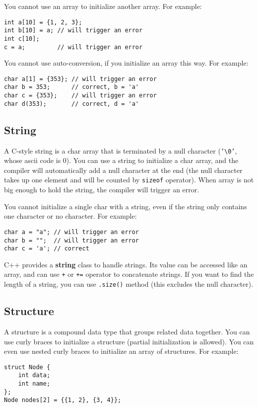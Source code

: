 \documentclass[a4paper,12pt]{article}
\begin{document}
You cannot use an array to initialize another array.
For example:
\begin{verbatim}
int a[10] = {1, 2, 3};
int b[10] = a; // will trigger an error
int c[10];
c = a;         // will trigger an error
\end{verbatim}

You cannot use auto-conversion, if you initialize an array this way.
For example:
\begin{verbatim}
char a[1] = {353}; // will trigger an error
char b = 353;      // correct, b = 'a'
char c = {353};    // will trigger an error
char d(353);       // correct, d = 'a'
\end{verbatim}

\subsection{String}

A C-style string is a char array that is terminated by a null character (\texttt{'\textbackslash 0'}, whose ascii code is 0).
You can use a string to initialize a char array, and the compiler will automatically add a null character at the end (the null character takes up one element and will be counted by \texttt{sizeof} operator).
When array is not big enough to hold the string, the compiler will trigger an error.

You cannot initialize a single char with a string, even if the string only contains one character or no character.
For example:
\begin{verbatim}
char a = "a"; // will trigger an error
char b = "";  // will trigger an error
char c = 'a'; // correct
\end{verbatim}

C++ provides a \textbf{string} class to handle strings.
Its value can be accessed like an array, and can use \texttt{+} or \texttt{+=} operator to concatenate strings.
If you want to find the length of a string, you can use \texttt{.size()} method (this excludes the null character).

\subsection{Structure}

A structure is a compound data type that groups related data together.
You can use curly braces to initialize a structure (partial initialization is allowed).
You can even use nested curly braces to initialize an array of structures.
For example:
\begin{verbatim}
struct Node {
    int data;
    int name;
};
Node nodes[2] = {{1, 2}, {3, 4}};
\end{verbatim}
\end{document}
